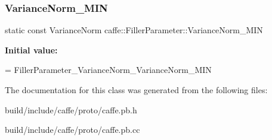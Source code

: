 \subsubsection{\texorpdfstring{Variance\+Norm\+\_\+\+M\+IN}{VarianceNorm\_MIN}}
{\footnotesize\ttfamily static const Variance\+Norm caffe\+::\+Filler\+Parameter\+::\+Variance\+Norm\+\_\+\+M\+IN\hspace{0.3cm}{\ttfamily [static]}}

{\bfseries Initial value\+:}
\begin{DoxyCode}
=
    FillerParameter\_VarianceNorm\_VarianceNorm\_MIN
\end{DoxyCode}


The documentation for this class was generated from the following files\+:\begin{DoxyCompactItemize}
\item 
build/include/caffe/proto/caffe.\+pb.\+h\item 
build/include/caffe/proto/caffe.\+pb.\+cc\end{DoxyCompactItemize}
